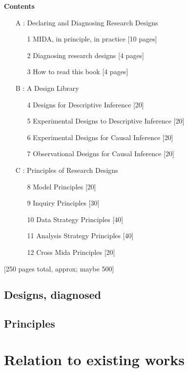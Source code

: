 \documentclass[11pt]{article}
\begin{document}
\begin{framed}
\noindent\textbf{Contents}
\begin{enumerate}
	\item[A]: Declaring and Diagnosing Research Designs
	
	\begin{enumerate}
		\item[1] MIDA, in principle, in practice [10 pages]
		\item[2] Diagnosing research designs [4 pages]
		\item[3] How to read this book [4 pages]
	\end{enumerate}
	
	\item[B]: A Design Library
	\begin{enumerate}
		\item[4] Designs for Descriptive Inference [20]
		\item[5] Experimental Designs to Descriptive Inference [20]
		\item[6] Experimental Designs for Causal Inference	 [20]
		\item[7] Observational Designs for Causal Inference [20]
	\end{enumerate}
	
	
	\item[C]: Principles of Research Designs
	\begin{enumerate}
		\item[8] Model Principles [20]
		\item[9] Inquiry Principles [30]
		\item[10] Data Strategy Principles [40]
		\item[11] Analysis Strategy Principles [40]
		\item[12] Cross Mida Principles [20]
	\end{enumerate}
	\end{enumerate}
[250 pages total, approx; maybe 500]
\end{framed}

\subsection{Designs, diagnosed}
\subsection{Principles}

\section{Relation to existing works}
\end{document}
